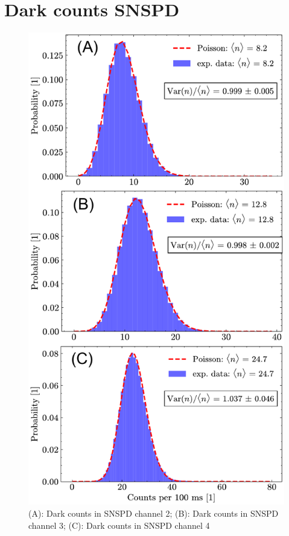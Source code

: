 \section*{Dark counts SNSPD}
\begin{figure}[h!]
	\centering
	\includegraphics[width=.7\textwidth]{Images/DC_SNSPD_All.pdf}
	\caption{(A): Dark counts in SNSPD channel 2; (B): Dark counts in SNSPD channel 3; (C): Dark counts in SNSPD channel 4}
	\label{fig:DC_SNSPD}
\end{figure}





